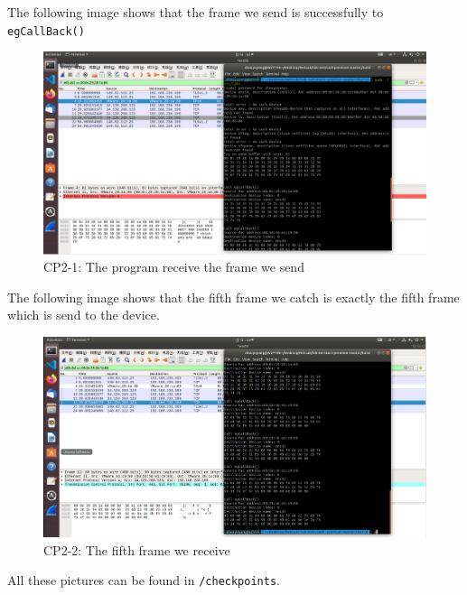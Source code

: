 \documentclass[11pt]{article}
\begin{document}
	The following image shows that the frame we send is successfully to \texttt{egCallBack()}
	
	\begin{figure}[htbp]
		\centering
		\includegraphics[width=0.65\linewidth]{../lab-netstack-premium-master/checkpoints/CP2-1.png}
		\caption{CP2-1: The program receive the frame we send}
		\label{fig:CP2-1}
	\end{figure}
	
	The following image shows that the fifth frame we catch is exactly the fifth frame which is send to the device.
	
	\begin{figure}[htbp]
		\centering
		\includegraphics[width=0.65\linewidth]{../lab-netstack-premium-master/checkpoints/CP2-2.png}
		\caption{CP2-2: The fifth frame we receive}
		\label{fig:CP2-2}
	\end{figure}
	
	All these pictures can be found in \texttt{/checkpoints}.
		
\end{document}
